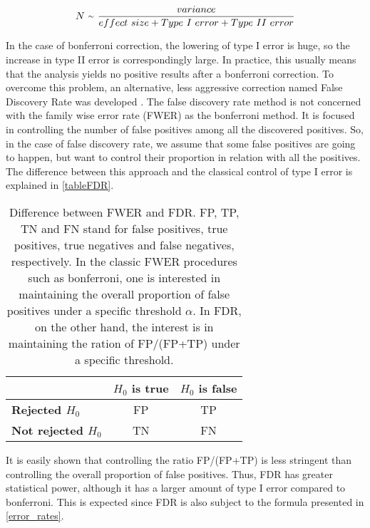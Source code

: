 \begin{equation}
\label{error_rates}
    N\ {\raise.17ex\hbox{$\scriptstyle\sim$}}\ \frac{variance}{effect\ size + Type\ I\ error + Type\ II\ error}
\end{equation}

In the case of bonferroni correction, the lowering of type I error is huge, so the increase in type II error is correspondingly large. In practice, this usually means that the analysis yields no positive results after a bonferroni correction. To overcome this problem, an alternative, less aggressive correction named False Discovery Rate was developed  \parencite{benjamini1995controlling}. The false discovery rate method is not concerned with the family wise error rate (FWER) as the bonferroni method. It is focused in controlling the number of false positives among all the discovered positives. So, in the case of false discovery rate, we assume that some false positives are going to happen, but want to control their proportion in relation with all the positives. The difference between this approach and the classical control of type I error is explained in \autoref{tableFDR}.

\vspace{10pt}
\begin{table}[h!]
\centering
\begin{tabular}{@{}lcc@{}}
\toprule
                         & \textbf{$H_0$ is true} & \textbf{$H_0$ is false} \\ \midrule
\textbf{Rejected $H_0$}     & FP      & TP        \\
\textbf{Not rejected $H_0$} & TN       & FN       \\ \bottomrule
\end{tabular}
\caption[Difference between FWER and FDR]{Difference between FWER and FDR. FP, TP, TN and FN stand for false positives, true positives, true negatives and false negatives, respectively. In the classic FWER procedures such as bonferroni, one is interested in maintaining the overall proportion of false positives under a specific threshold $\alpha$. In FDR, on the other hand, the interest is in maintaining the ration of FP/(FP+TP) under a specific threshold.}
\label{tableFDR}
\end{table}
\vspace{10pt}

It is easily shown that controlling the ratio FP/(FP+TP) is less stringent than controlling the overall proportion of false positives. Thus, FDR has greater statistical power, although it has a larger amount of type I error compared to bonferroni. This is expected since FDR is also subject to the formula presented in \autoref{error_rates}.

